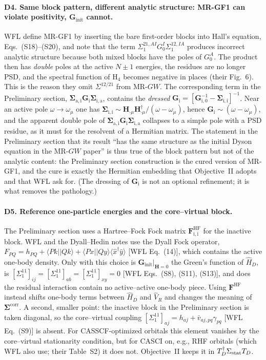 \documentclass[11pt,a4paper]{article}
\newcommand{\bG}{\boldsymbol{G}}
\newcommand{\bSigma}{\boldsymbol{\Sigma}}
\newcommand{\bH}{\boldsymbol{H}}
\newcommand{\bF}{\boldsymbol{F}}
\newcommand{\braket}[1]{\langle#1\rangle}
\newcommand{\MRGW}{MR-$GW$}
\newcommand{\WFL}{WFL}
\newcommand{\Pre}{Preliminary section}
\newcommand{\DHN}{Dyall--Hedin notes}
\begin{document}
\paragraph{D4. Same block pattern, different analytic structure: MR-GF1 can
violate positivity, $\bG_{\text{init}}$ cannot.}
\WFL{} define MR-GF1 by inserting the bare first-order blocks into Hall's
equation, Eqs.~(S18)--(S20), and note that the term
$\Sigma_1^{21,AI}G_0^I\Sigma_1^{12,IA}$ produces incorrect analytic structure
because both mixed blocks have the poles of $G_0^A$.  The product then has
\emph{double} poles at the active $N\pm1$ energies, the residues are no longer
PSD, and the spectral function of H$_4$ becomes negative in places (their
Fig.~6).  This is the reason they omit $\Sigma^{12/21}$ from \MRGW{}.  The
corresponding term in the \Pre{}, $\bSigma_{\mathrm{a,i}}\bG_{\mathrm i}\bSigma_{\mathrm{i,a}}$,
contains the \emph{dressed} $\bG_{\mathrm i}=[\bG_{\mathrm i,0}^{-1}-\bSigma_{\mathrm{i,i}}]^{-1}$.
Near an active pole $\omega\to\omega_\mu$ one has
$\bSigma_{\mathrm{i,i}}\sim \bH_{\cdot\mu}\bH_{\cdot\mu}^\dagger/(\omega-\omega_\mu)$,
hence $\bG_{\mathrm i}\sim(\omega-\omega_\mu)$, and the apparent double pole
of $\bSigma_{\mathrm{a,i}}\bG_{\mathrm i}\bSigma_{\mathrm{i,a}}$ collapses to a
simple pole with a PSD residue, as it must for the resolvent of a Hermitian
matrix.  The statement in the \Pre{} that its result ``has the same structure
as the initial Dyson equation in the \MRGW{} paper'' is thus true of the block
pattern but not of the analytic content: the \Pre{} construction is the
cured version of MR-GF1, and the cure is exactly the Hermitian embedding that
Objective~II adopts and that \WFL{} ask for.  (The dressing of $\bG_{\mathrm i}$
is not an optional refinement; it is what removes the pathology.)

\paragraph{D5. Reference one-particle energies and the core--virtual block.}
The \Pre{} uses a Hartree--Fock Fock matrix $\bF^{\text{HF}}_{\mathrm{i,i}}$
for the inactive block.  \WFL{} and the \DHN{} use the Dyall Fock operator,
$F_{PQ}=h_{PQ}+\braket{Pk||Qk}+\braket{Px||Qy}\braket{\hat x^\dagger\hat y}$
[\WFL{} Eq.~(14)], which contains the active one-body density.  Only with this
choice is $\bG_{\text{init}}|_{\bH=0}$ the Green's function of $\hat H_D$, is
$[\Sigma_1^{11}]_{ij}=[\Sigma_1^{11}]_{ab}=[\Sigma_1^{11}]_{xy}=0$ [\WFL{}
Eqs.~(S8), (S11), (S13)], and does the residual interaction contain no
active--active one-body piece.  Using $\bF^{\text{HF}}$ instead shifts
one-body terms between $\hat H_D$ and $\hat V_R$ and changes the meaning of
$\bSigma^{\text{corr}}$.  A second, smaller point: the inactive block in the
\Pre{} is taken diagonal, so the core--virtual coupling
$[\Sigma_1^{11}]_{aj}=h_{aj}+\bar v_{aj,pq}\gamma_{pq}$ [\WFL{} Eq.~(S9)] is
absent.  For CASSCF-optimized orbitals this element vanishes by the
core--virtual stationarity condition, but for CASCI on, e.g., RHF orbitals
(which \WFL{} also use; their Table~S2) it does not.  Objective~II keeps it in
$T_D^\dagger\Sigma_{\rm stat}T_D$.
\end{document}
